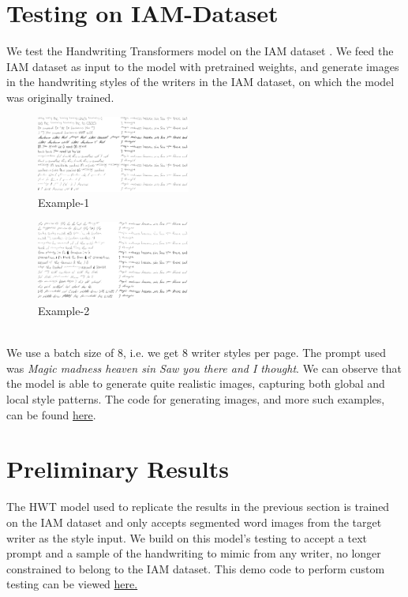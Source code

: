 \documentclass[10pt,twocolumn,letterpaper]{article}
\begin{document}
\section{Testing on IAM-Dataset}
We test the Handwriting Transformers model on the IAM dataset \cite{IAM}. We feed the IAM dataset as input to the model with pretrained weights, and generate images in the handwriting styles of the writers in the IAM dataset, on which the model was originally trained. 
\begin{figure}[h]
  \centering
  \includegraphics[width=0.45\textwidth]{../latex-src/Images/IAM-test1.png}
  \caption{Example-1}
  \label{fig:IAM-test}
\end{figure}
\begin{figure}[h]
  \centering
  \includegraphics[width=0.45\textwidth]{../latex-src/Images/IAM-test2.png}
  \caption{Example-2}
  \label{fig:IAM-test2}
\end{figure} \\
We use a batch size of 8, i.e. we get 8 writer styles per page. The prompt used was \emph{Magic madness heaven sin Saw you there and I thought}. We can observe that the model is able to generate quite realistic images, capturing both global and local style patterns. The code for generating images, and more such examples, can be found \href{https://github.com/Shambu-K/handwriting-generator-model/blob/main/demo-hwt.ipynb}{here}.
\\
\section{Preliminary Results}
The HWT model used to replicate the results in the previous section is trained on the IAM dataset \cite{IAM} and only accepts segmented word images from the target writer as the style input. We build on this model's testing to accept a text prompt and a sample of the handwriting to mimic from any writer, no longer constrained to belong to the IAM dataset. This demo code to perform custom testing can be viewed \href{https://github.com/Shambu-K/handwriting-generator-model/blob/main/demo-hwt.ipynb}{here.}
\end{document}
